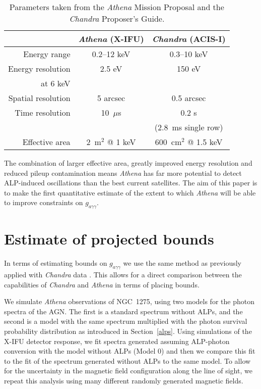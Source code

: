 \documentclass[fleqn,usenatbib,useAMS]{mnras}
\begin{document}
\begin{table}

\centering
\begin{tabular}{r|c|c}
& {\it Athena} (X-IFU) & {\it Chandra} (ACIS-I)\\
\hline\hline
Energy range & 0.2--12 keV & 0.3--10 keV\\ \hline
Energy resolution & 2.5 eV & 150 eV\\ 
 at 6 keV & & \\ \hline
Spatial resolution & 5 arcsec & 0.5 arcsec\\ \hline
Time resolution & 10~$\mu$s & 0.2 s\\
& & (2.8~ms single row)\\ \hline
Effective area & 2~m$^2$ @ 1 keV & 600~cm$^2$ @ 1.5 keV \\ \hline
\end{tabular}
\caption{Parameters taken from the {\it Athena} Mission Proposal and the {\it Chandra} Proposer's Guide.}
\label{satellites}
\end{table}

The combination of larger effective area, greatly improved energy resolution and reduced pileup contamination means {\it Athena} has far more potential to detect ALP-induced oscillations than the best current satellites. The aim of this paper is
to make the first quantitative estimate of the extent to which {\it Athena} will be able to improve constraints on
$g_{a\gamma\gamma}$.

\section{Estimate of projected bounds}
\label{bounds}
In terms of estimating bounds on $g_{a\gamma\gamma}$ we use the same method as previously applied with
{\it Chandra} data \citep{Berg:2016ese}. This allows for a direct comparison
between the capabilities of {\it Chandra} and {\it Athena} in terms of placing bounds.

We simulate {\it Athena} observations of NGC~1275, using two models for the photon spectra of the AGN.
The first is a standard spectrum without ALPs, and the second is a model with the same spectrum multiplied with the
photon survival probability distribution as introduced in Section~\ref{alps}. Using simulations of the
X-IFU detector response, we fit spectra generated assuming ALP-photon conversion with the model without ALPs (Model 0) and then we compare this fit to the fit of the spectrum generated without ALPs to the same model.
To allow for the uncertainty in the
magnetic field configuration along the line of sight, we repeat this analysis using many different randomly generated magnetic fields.
\end{document}
